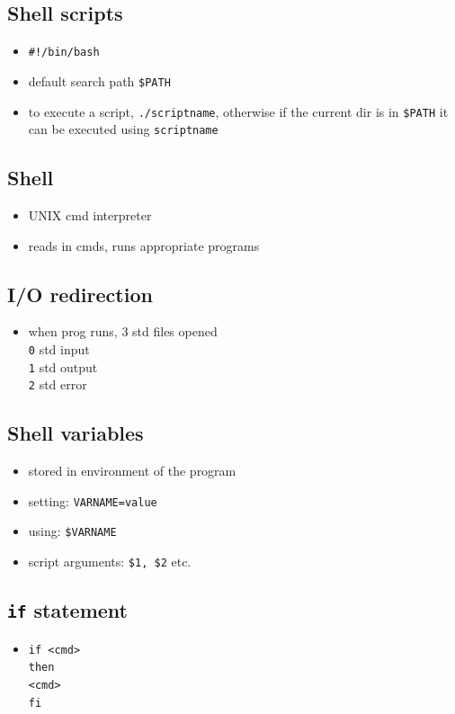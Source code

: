 \documentclass[10pt, multicolumn, a4paper]{article}
\begin{document}
\begin{multicols}{2}
	\subsection*{Shell scripts}
	\begin{itemize}
	\item \verb|#!/bin/bash|
	\item default search path \verb|$PATH|
	\item to execute a script, \verb|./scriptname|, otherwise if the current dir is in \verb|$PATH| it can be executed using \verb|scriptname|
	\end{itemize}
	\subsection*{Shell}
	\begin{itemize}
	\item UNIX cmd interpreter
	\item reads in cmds, runs appropriate programs
	\end{itemize}
	\subsection*{I/O redirection}
	\begin{itemize}
	\item when prog runs, 3 std files opened 
		\\ \verb|0| std input \\ \verb|1| std output \\ \verb|2| std error
	\end{itemize}
	\subsection*{Shell variables}
	\begin{itemize}
	\item stored in environment of the program
	\item setting: \verb|VARNAME=value|
	\item using: \verb|$VARNAME|
	\item script arguments: \verb|$1, $2| etc.
	\end{itemize}
	\subsection*{\texttt{if} statement}
	\begin{itemize}
	\item \texttt{if <cmd> \\ then \\ \hspace*{5mm} <cmd> \\ fi}
	\end{itemize}

\end{multicols}
\end{document}
